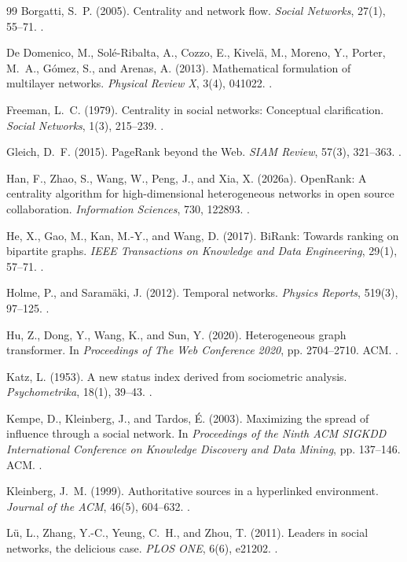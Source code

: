 \begin{thebibliography}{99}
\label{refs:chapter05}
Borgatti, S.~P. (2005).
Centrality and network flow.
\emph{Social Networks}, 27(1), 55--71.
.

De Domenico, M., Sol\'e-Ribalta, A., Cozzo, E., Kivel\"a, M., Moreno, Y., Porter, M.~A., G\'omez, S., and Arenas, A. (2013).
Mathematical formulation of multilayer networks.
\emph{Physical Review X}, 3(4), 041022.
.

Freeman, L.~C. (1979).
Centrality in social networks: Conceptual clarification.
\emph{Social Networks}, 1(3), 215--239.
.

Gleich, D.~F. (2015).
PageRank beyond the Web.
\emph{SIAM Review}, 57(3), 321--363.
.

Han, F., Zhao, S., Wang, W., Peng, J., and Xia, X. (2026a).
OpenRank: A centrality algorithm for high-dimensional heterogeneous networks in open source collaboration.
\emph{Information Sciences}, 730, 122893.
.

He, X., Gao, M., Kan, M.-Y., and Wang, D. (2017).
BiRank: Towards ranking on bipartite graphs.
\emph{IEEE Transactions on Knowledge and Data Engineering}, 29(1), 57--71.
.

Holme, P., and Saram\"aki, J. (2012).
Temporal networks.
\emph{Physics Reports}, 519(3), 97--125.
.

Hu, Z., Dong, Y., Wang, K., and Sun, Y. (2020).
Heterogeneous graph transformer.
In \emph{Proceedings of The Web Conference 2020}, pp. 2704--2710. ACM.
.

Katz, L. (1953).
A new status index derived from sociometric analysis.
\emph{Psychometrika}, 18(1), 39--43.
.

Kempe, D., Kleinberg, J., and Tardos, \'E. (2003).
Maximizing the spread of influence through a social network.
In \emph{Proceedings of the Ninth ACM SIGKDD International Conference on Knowledge Discovery and Data Mining}, pp. 137--146. ACM.
.

Kleinberg, J.~M. (1999).
Authoritative sources in a hyperlinked environment.
\emph{Journal of the ACM}, 46(5), 604--632.
.

L\"u, L., Zhang, Y.-C., Yeung, C.~H., and Zhou, T. (2011).
Leaders in social networks, the delicious case.
\emph{PLOS ONE}, 6(6), e21202.
.

\end{thebibliography}
